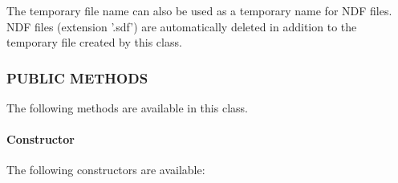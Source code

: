 The temporary file name can also be used as a temporary name for
NDF files. NDF files (extension '.sdf') are automatically deleted
in addition to the temporary file created by this class.

\subsubsection*{PUBLIC METHODS\label{ORAC::TempFile_PUBLIC_METHODS}}


The following methods are available in this class.

\paragraph*{Constructor\label{ORAC::TempFile_Constructor}}


The following constructors are available:

